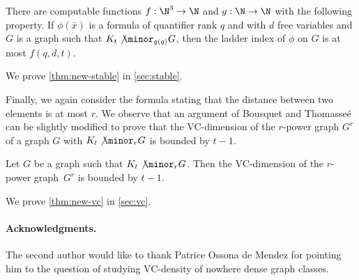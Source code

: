 \begin{theorem}\label{thm:new-stable}
  There are computable functions $f:\N^3\to\N$ and $g:\N\to\N$ with the following property.
If $\phi(\bar x)$ is a formula of quantifier rank $q$ and with $d$ free variables
and  $G$ is a graph such that $K_t\not\minor_{g(q)} G$, then the ladder index of $\phi$ on $G$ is at most $f(q,d,t)$. 
\end{theorem}

We prove \cref{thm:new-stable} in \cref{sec:stable}. 

\bigskip

Finally, we again consider the formula stating that the distance
between two elements is at most $r$. 
We observe that an argument of Bousquet and 
Thomasse\'e~\cite{BousquetT15} can be slightly modified to prove that 
the VC-dimension of the $r$-power graph $G^r$ of a graph $G$
with $K_t\not\minor_r G$ is bounded by $t-1$.

\begin{theorem}\label{thm:new-vc}
Let $G$ be a graph such that $K_t\not\minor_r G$. Then the
VC-dimension of the $r$-power graph~$G^r$ is bounded by $t-1$. 
\end{theorem}

We prove \cref{thm:new-vc} in \cref{sec:vc}. 


\paragraph{Acknowledgments.} The second author would like to 
thank Patrice Ossona de Mendez for pointing him to the 
question of studying VC-density of nowhere dense graph 
classes. 